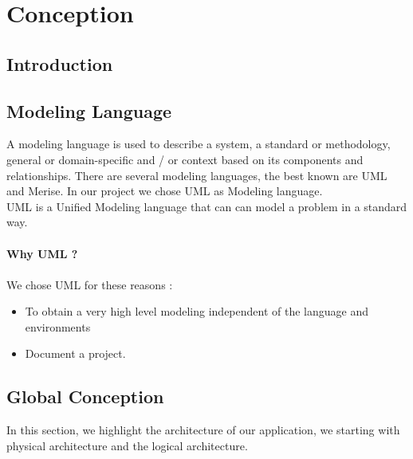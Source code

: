 
	\chapter{Conception}
\makeatletter
\ifdefined\XeTeXversion
\def\@cliptoboxdim#1{%
	\setbox #1=\hbox{%
		\Gin@defaultbp\WIDTH{\wd #1}%
		\Gin@defaultbp \DEPTH {\dp #1}%
		\@tempdima \ht #1%
		\advance\@tempdima\dp#1%
		\Gin@defaultbp \TOTALHEIGHT {\@tempdima }%
		\special{pdf:literal q}%
		\special{pdf:literal 0 -\DEPTH \space \WIDTH \space \TOTALHEIGHT \space re W n }%
		\rlap{\copy #1}%
		\special {pdf:literal Q}%
		\hskip\wd#1%
	}%
}
\fi
\makeatother
	
	\section{Introduction}

	\section{Modeling Language}
		A modeling language is used to describe a system, a standard or methodology, general or domain-specific and / or context based on its components and relationships.
	There are several modeling languages, the best known are UML and Merise. In our project we chose UML as Modeling language.
	\\
	UML is a Unified Modeling language that can can model a problem in a standard way.
	\\
	\\
	\textbf{Why UML ?}
	\\
	\\
	We chose UML for these reasons : 
	\begin{itemize}
	\item To obtain a very high level modeling independent of the language and environments
	\item Document a project. 
	\end{itemize}
	
	\section{Global Conception}
	In this section, we highlight the architecture of our application, we starting  with physical architecture and the logical architecture.
	
	\clearpage
	\newpage
